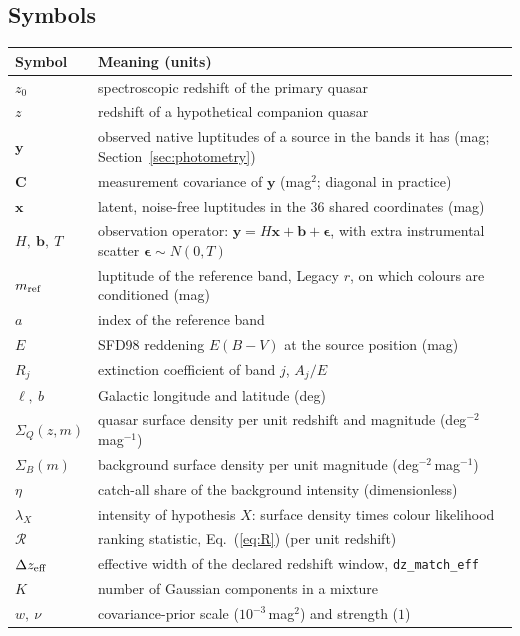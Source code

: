 \documentclass[11pt,a4paper]{article}
\newcommand{\vect}[1]{\boldsymbol{#1}}
\newcommand{\R}{\mathcal{R}}
\newcommand{\code}[1]{\texttt{#1}}
\begin{document}
\subsection{Symbols}
\begin{center}\small
\begin{tabular}{p{}p{}}
\toprule
Symbol & Meaning (units) \\
\midrule
$z_0$ & spectroscopic redshift of the primary quasar \\
$z$ & redshift of a hypothetical companion quasar \\
$\vect{y}$ & observed native luptitudes of a source in the bands it has (mag; Section~\ref{sec:photometry}) \\
$\vect{C}$ & measurement covariance of $\vect{y}$ (mag$^2$; diagonal in practice) \\
$\vect{x}$ & latent, noise-free luptitudes in the 36 shared coordinates (mag) \\
$H,\ \vect{b},\ T$ & observation operator: $\vect{y}=H\vect{x}+\vect{b}+\vect{\epsilon}$, with extra instrumental scatter $\vect{\epsilon}\sim N(0,T)$ \\
$m_{\rm ref}$ & luptitude of the reference band, Legacy $r$, on which colours are conditioned (mag) \\
$a$ & index of the reference band \\
$E$ & SFD98 reddening $E(B-V)$ at the source position (mag) \\
$R_j$ & extinction coefficient of band $j$, $A_j/E$ \\
$\ell,\ b$ & Galactic longitude and latitude (deg) \\
$\Sigma_Q(z,m)$ & quasar surface density per unit redshift and magnitude (deg$^{-2}$\,mag$^{-1}$) \\
$\Sigma_B(m)$ & background surface density per unit magnitude (deg$^{-2}$\,mag$^{-1}$) \\
$\eta$ & catch-all share of the background intensity (dimensionless) \\
$\lambda_X$ & intensity of hypothesis $X$: surface density times colour likelihood \\
$\R$ & ranking statistic, Eq.~(\ref{eq:R}) (per unit redshift) \\
$\Delta z_{\rm eff}$ & effective width of the declared redshift window, \code{dz\_match\_eff} \\
$K$ & number of Gaussian components in a mixture \\
$w,\ \nu$ & covariance-prior scale ($10^{-3}$\,mag$^2$) and strength ($1$) \\
\bottomrule
\end{tabular}
\end{center}
\end{document}
